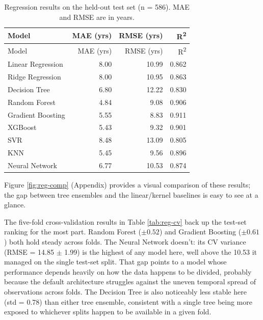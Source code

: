 \documentclass[11pt,a4paper]{article}
\begin{document}
\begin{longtable}[]{@{}lrrr@{}}
\caption{\label{tab:reg-results}Regression results on the held-out test
set (n = 586). MAE and RMSE are in years.}\tabularnewline
\toprule\noalign{}
Model & MAE (yrs) & RMSE (yrs) & R\textsuperscript{2} \\
\midrule\noalign{}
\endfirsthead
\toprule\noalign{}
Model & MAE (yrs) & RMSE (yrs) & R\textsuperscript{2} \\
\midrule\noalign{}
\endhead
\bottomrule\noalign{}
\endlastfoot
Linear Regression & 8.00 & 10.99 & 0.862 \\
Ridge Regression & 8.00 & 10.95 & 0.863 \\
Decision Tree & 6.80 & 12.22 & 0.830 \\
Random Forest & 4.84 & 9.08 & 0.906 \\
Gradient Boosting & 5.55 & 8.83 & 0.911 \\
XGBoost & 5.43 & 9.32 & 0.901 \\
SVR & 8.48 & 13.09 & 0.805 \\
KNN & 5.45 & 9.56 & 0.896 \\
Neural Network & 6.77 & 10.53 & 0.874 \\
\end{longtable}

Figure \ref{fig:reg-comp} (Appendix) provides a visual comparison of
these results; the gap between tree ensembles and the linear/kernel
baselines is easy to see at a glance.

The five-fold cross-validation results in Table \ref{tab:reg-cv} back up
the test-set ranking for the most part. Random Forest (\(\pm 0.52\)) and
Gradient Boosting (\(\pm 0.61\)) both hold steady across folds. The
Neural Network doesn't: its CV variance (RMSE = 14.85 \(\pm\) 1.99) is
the highest of any model here, well above the 10.53 it managed on the
single test-set split. That gap points to a model whose performance
depends heavily on how the data happens to be divided, probably because
the default architecture struggles against the uneven temporal spread of
observations across folds. The Decision Tree is also noticeably less
stable here (std = 0.78) than either tree ensemble, consistent with a
single tree being more exposed to whichever splits happen to be
available in a given fold.
\end{document}
